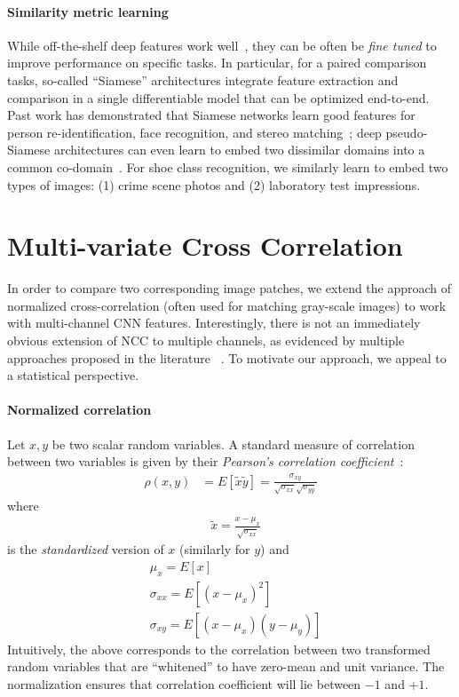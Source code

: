 \documentclass[twocolumn]{svjour3}           %
\begin{document}
\paragraph{Similarity metric learning}
While off-the-shelf deep features work well~\cite{sharif2014cnn}, they can be
often be {\em fine tuned} to improve performance on specific tasks. In
particular, for a paired comparison tasks, so-called ``Siamese'' architectures
integrate feature extraction and comparison in a single differentiable model
that can be optimized end-to-end.  Past work has demonstrated that Siamese
networks learn good features for person re-identification, face recognition,
and stereo matching~\cite{zbontar2015computing,parkhi2015deep,xiao2016learning}; 
deep pseudo-Siamese architectures can even learn to embed two dissimilar
domains into a common co-domain~\cite{zagoruyko2015learning}.  For shoe class
recognition, we similarly learn to embed two types of images: (1) crime scene
photos and (2) laboratory test impressions.

\section{Multi-variate Cross Correlation}
In order to compare two corresponding image patches, we extend the approach of
normalized cross-correlation (often used for matching gray-scale images) to work
with multi-channel CNN features.  Interestingly, there is not an immediately
obvious extension of NCC to multiple channels, as evidenced by multiple
approaches proposed in the literature
~\cite{fisher1995multi,martin1979multivariate,geiss1991multivariate,popper1974multivariate}.
To motivate our approach, we appeal to a statistical perspective. 

\paragraph{Normalized correlation} Let $x,y$ be two scalar random variables. A
standard measure of correlation between two variables is given by their {\em
Pearson's correlation coefficient}~\cite{martin1979multivariate}:
\begin{align}
  \rho(x,y) &= E[\tilde{x}\tilde{y}] = \frac{\sigma_{xy}}{\sqrt{\sigma_{xx}} \sqrt{\sigma_{yy}}} \label{eq:pearson} 
\end{align}
where
\begin{align}
  &\tilde{x} = \frac{x - \mu_x}{\sqrt{\sigma_{xx}}} \nonumber 
\end{align}
is the {\em standardized} version of $x$ (similarly for $y$) and 
\begin{align}
  &\mu_x = E[x] \nonumber \\
  &\sigma_{xx} = E[(x - \mu_x)^2] \nonumber \\
  &\sigma_{xy} = E[(x - \mu_x) (y - \mu_y)] \nonumber
\end{align}
Intuitively, the above corresponds to the correlation between two transformed
random variables that are ``whitened'' to have zero-mean and unit variance. The
normalization ensures that correlation coefficient will lie between $-1$ and
$+1$.
\end{document}
